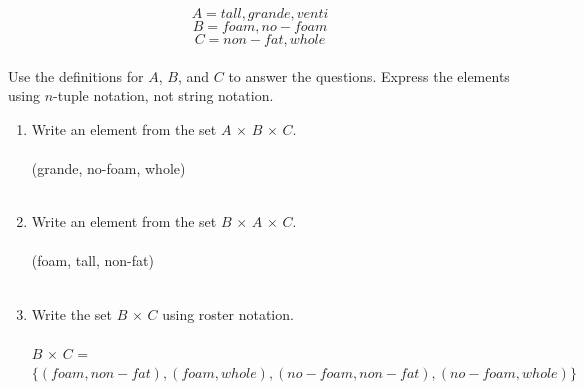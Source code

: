 \documentclass{amsart}
\theoremstyle{definition}
\theoremstyle{Exercise}
\theoremstyle{remark}
\theoremstyle{rule}
\numberwithin{equation}{section}
\begin{document}
\[A = {tall, grande, venti}\]
\[B = {foam, no-foam}\]
\[C = {non-fat, whole}\]\\
Use the definitions for $A$, $B$, and $C$ to answer the questions. Express the elements using $n$-tuple notation, not string notation.\\
\begin{enumerate}[label=(\alph*)]

\item Write an element from the set $A\, \times \,B \, \times \,C$.\\\\
(grande, no-foam, whole)
\\\\

\item Write an element from the set $B\, \times \,A \, \times \,C$.\\\\
(foam, tall, non-fat)
\\\\

\item Write the set $B \, \times \,C$ using roster notation.\\\\
$B \, \times \,C$ = $\{(foam, non-fat), (foam, whole), (no-foam, non-fat), (no-foam, whole)\}$
\\\\

\end{enumerate}
\end{document}
